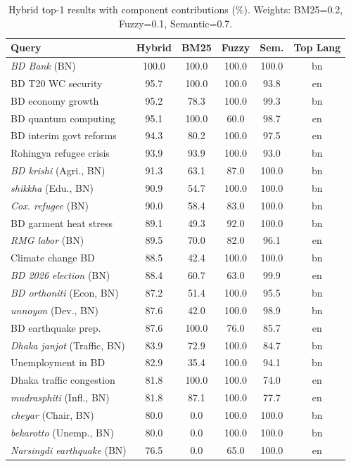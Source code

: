 \documentclass[12pt,a4paper]{article}
\newcommand{\bn}[1]{\textit{#1}}
\begin{document}
\begin{table}[H]
\centering
\caption{Hybrid top-1 results with component contributions (\%). Weights: BM25=0.2, Fuzzy=0.1, Semantic=0.7.}
\label{tab:hybrid_results}
\begin{tabular}{p{3cm}ccccc}
\toprule
\textbf{Query} & \textbf{Hybrid} & \textbf{BM25} & \textbf{Fuzzy} & \textbf{Sem.} & \textbf{Top Lang} \\
\midrule
\bn{BD Bank} (BN)         & 100.0 & 100.0 & 100.0 & 100.0 & bn \\
BD T20 WC security         & 95.7  & 100.0 & 100.0 & 93.8  & en \\
BD economy growth           & 95.2  & 78.3  & 100.0 & 99.3  & bn \\
BD quantum computing        & 95.1  & 100.0 & 60.0  & 98.7  & en \\
BD interim govt reforms     & 94.3  & 80.2  & 100.0 & 97.5  & en \\
Rohingya refugee crisis     & 93.9  & 93.9  & 100.0 & 93.0  & bn \\
\bn{BD krishi} (Agri., BN) & 91.3  & 63.1  & 87.0  & 100.0 & bn \\
\bn{shikkha} (Edu., BN)    & 90.9  & 54.7  & 100.0 & 100.0 & bn \\
\bn{Cox. refugee} (BN)     & 90.0  & 58.4  & 83.0  & 100.0 & bn \\
BD garment heat stress      & 89.1  & 49.3  & 92.0  & 100.0 & bn \\
\bn{RMG labor} (BN)        & 89.5  & 70.0  & 82.0  & 96.1  & en \\
Climate change BD           & 88.5  & 42.4  & 100.0 & 100.0 & bn \\
\bn{BD 2026 election} (BN) & 88.4  & 60.7  & 63.0  & 99.9  & en \\
\bn{BD orthoniti} (Econ, BN) & 87.2 & 51.4 & 100.0 & 95.5  & bn \\
\bn{unnoyon} (Dev., BN)    & 87.6  & 42.0  & 100.0 & 98.9  & bn \\
BD earthquake prep.         & 87.6  & 100.0 & 76.0  & 85.7  & en \\
\bn{Dhaka janjot} (Traffic, BN) & 83.9 & 72.9 & 100.0 & 84.7 & bn \\
Unemployment in BD          & 82.9  & 35.4  & 100.0 & 94.1  & bn \\
Dhaka traffic congestion    & 81.8  & 100.0 & 100.0 & 74.0  & en \\
\bn{mudrasphiti} (Infl., BN) & 81.8 & 87.1 & 100.0 & 77.7 & en \\
\bn{cheyar} (Chair, BN)    & 80.0  & 0.0   & 100.0 & 100.0 & bn \\
\bn{bekarotto} (Unemp., BN) & 80.0 & 0.0  & 100.0 & 100.0 & bn \\
\bn{Narsingdi earthquake} (BN) & 76.5 & 0.0 & 65.0 & 100.0 & en \\
\bottomrule
\end{tabular}
\end{table}
\end{document}
